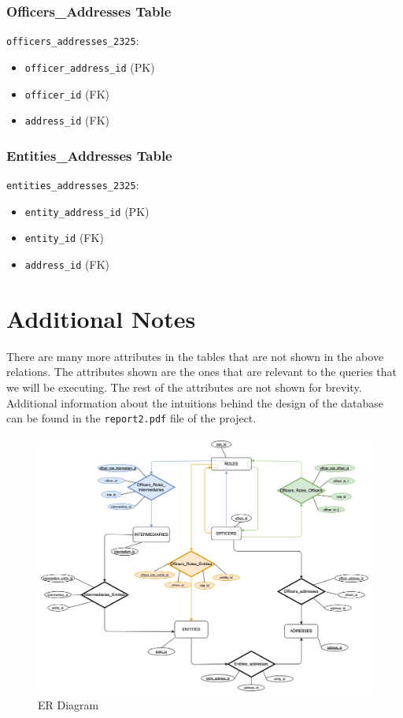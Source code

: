 \documentclass{article}
\begin{document}
\begin{minipage}{0.5\textwidth}
    \subsubsection*{Officers\_Addresses Table}
    \texttt{officers\_addresses\_2325}:
    \begin{itemize}
        \item \texttt{officer\_address\_id} (PK)
        \item \texttt{officer\_id} (FK)
        \item \texttt{address\_id} (FK)
    \end{itemize}

    \subsubsection*{Entities\_Addresses Table}
    \texttt{entities\_addresses\_2325}:
    \begin{itemize}
        \item \texttt{entity\_address\_id} (PK)
        \item \texttt{entity\_id} (FK)
        \item \texttt{address\_id} (FK)
    \end{itemize}

\end{minipage}


\section*{\centering Additional Notes}
There are many more attributes in the tables that are not shown in the above relations. The attributes shown are the ones that are relevant to the queries that we will be executing. The rest of the attributes are not shown for brevity. Additional information about the intuitions behind the design of the database can be found in the \texttt{report2.pdf} file of the project.





\begin{figure}[h]
    \centering
    \includegraphics[width=\textwidth]{er.png}
    \caption{ER Diagram}
    \label{fig:er-diagram}
\end{figure}
\end{document}
